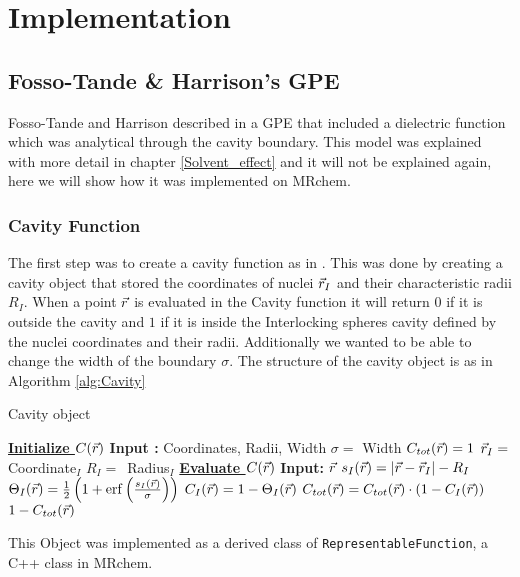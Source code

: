 \documentclass[../master_thesis.tex]{subfiles}
\begin{document}
\chapter{Implementation}\label{chap:implementation}
\section{Fosso-Tande \& Harrison's \ac{GPE}}
Fosso-Tande and Harrison described in \cite{FossoTande:2013ka} a \ac{GPE} that
included a dielectric function which was analytical through the cavity boundary.
This model was explained with more detail in chapter \ref{Solvent_effect} and
it will not be explained again, here we will show how it was implemented on
MRchem.
\subsection{Cavity Function}
The first step was to create a cavity function as in \cite{FossoTande:2013ka}.
This was done by creating a cavity object that stored the coordinates of nuclei
$\vec{r}_I$ and their characteristic radii $R_I$. When a point $\vec{r}$ is evaluated
in the Cavity function it will return $0$ if it is outside the cavity and $1$ if
it is inside the Interlocking spheres cavity defined by the nuclei coordinates
and their radii. Additionally we wanted to be able to change the width of the
boundary $\sigma$. The structure of the cavity object is as in Algorithm \ref{alg:Cavity}

\begin{algorithm}
  \caption{Cavity object}\label{alg:Cavity}
  \begin{algorithmic}
    \STATE \underline{\textbf{Initialize $C(\vec{r})$}}
    \STATE \textbf{Input :} Coordinates, Radii, Width
    \STATE $\sigma = $ Width
    \STATE $C_{tot}(\vec{r}) = 1$
     \STATE $\vec{r}_I = $ Coordinate$_I$
     \STATE $R_I = $ Radius$_I$
    \ENDFOR
    \STATE
    \STATE \underline{\textbf{Evaluate $C(\vec{r})$}}
    \STATE \textbf{Input: } $\vec{r}$
      \STATE $s_I(\vec{r}) = \abs{\vec{r} - \vec{r}_I} - R_I$
      \STATE $\Theta_I(\rvec) = \frac{1}{2}\left(1 + \erf\left(\frac{s_I(\rvec)}{\sigma}\right)\right)$
      \STATE $ C_I(\vec{r}) = 1 -\Theta_I(\vec{r}) $
      \STATE $ C_{tot}(\vec{r}) = C_{tot}(\vec{r}) \cdot (1 - C_{I}(\vec{r}))$
    \ENDFOR
    \RETURN $ 1 - C_{tot}(\vec{r})$
  \end{algorithmic}
\end{algorithm}
This Object was implemented as a derived class of \verb!RepresentableFunction!,
a C++ class in MRchem.
\end{document}
